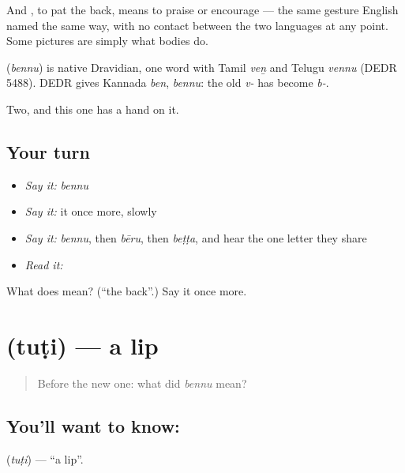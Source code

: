 And  , to pat the back, means to praise or encourage — the same gesture English named the same way, with no contact between the two languages at any point. Some pictures are simply what bodies do.

\begin{cousinweb}
\textbf{} (\emph{bennu}) is native Dravidian, one word with Tamil \emph{veṉ} and Telugu \emph{vennu} (DEDR 5488). DEDR gives Kannada \emph{ben}, \emph{bennu}: the old \emph{v-} has become \emph{b-}.
\end{cousinweb}

\begin{grammarlens}[title={What you've built}]
Two, and this one has a hand on it.
\end{grammarlens}

\subsection*{Your turn}
\begin{itemize}
\raggedright
  \item \emph{Say it:} \emph{bennu}
  \item \emph{Say it:} it once more, slowly
  \item \emph{Say it:} \emph{bennu}, then \emph{bēru}, then \emph{beṭṭa}, and hear the one letter they share
  \item \emph{Read it:} \textbf{}
\end{itemize}

\begin{tcolorbox}[breakable,colback=teal!4,colframe=teal!35!black,title={Before you move on}]
What does  mean? (\textquotedblleft{}the back\textquotedblright{}.) Say it once more.
\end{tcolorbox}
\section[\texorpdfstring{\kn{ತುಟಿ} (tuṭi)}{ತುಟಿ (tuṭi)}]{ (tuṭi) — a lip}

\label{lesson:KA-C57-lip}



\begin{quote}
Before the new one: what did \emph{bennu} mean?
\end{quote}

\subsection*{You'll want to know: }
\textbf{} (\emph{tuṭi}) — \textquotedblleft{}a lip\textquotedblright{}.

